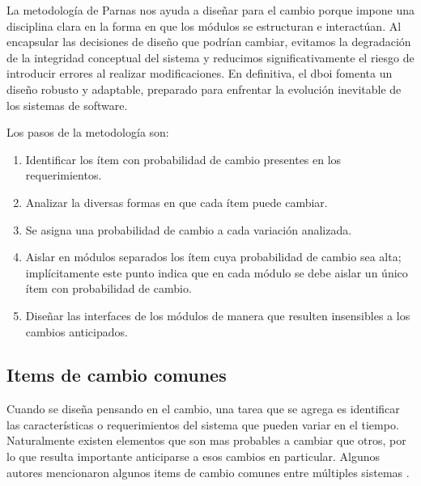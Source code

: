 La metodología de Parnas nos ayuda a diseñar para el cambio porque impone una disciplina clara en la forma en que los módulos se estructuran e interactúan. Al encapsular las decisiones de diseño que podrían cambiar, evitamos la degradación de la integridad conceptual del sistema y reducimos significativamente el riesgo de introducir errores al realizar modificaciones. En definitiva, el \gls{dboi} fomenta un diseño robusto y adaptable, preparado para enfrentar la evolución inevitable de los sistemas de software.


Los pasos de la metodología son:

\begin{enumerate}
	\item Identificar los ítem con probabilidad de cambio presentes en los requerimientos.
	\item Analizar la diversas formas en que cada ítem puede cambiar.
	\item Se asigna una probabilidad de cambio a cada variación analizada.
	\item Aislar en módulos separados los ítem cuya probabilidad de cambio sea alta; implícitamente este punto indica que en cada módulo se debe aislar un único ítem con probabilidad de cambio.
	\item Diseñar las interfaces de los módulos de manera que resulten insensibles a los cambios anticipados.

\end{enumerate}



\subsection{Items de cambio comunes}
\label{listaItems}

Cuando se diseña pensando en el cambio, una tarea que se agrega es identificar las características o requerimientos del sistema que pueden variar en el tiempo. Naturalmente existen elementos que son mas probables a cambiar que otros, por lo que resulta importante anticiparse a esos cambios en particular. Algunos autores mencionaron algunos items de cambio comunes entre múltiples sistemas \cite{Parnas02}.

